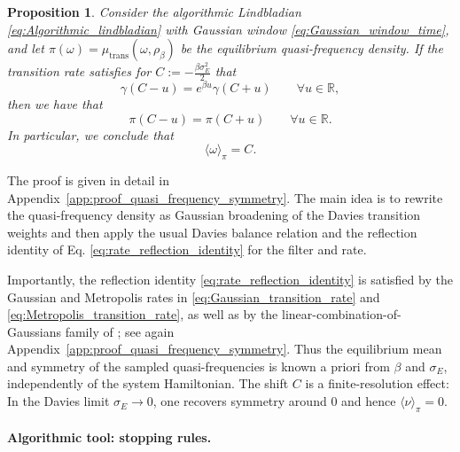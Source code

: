 \documentclass[showpacs,amsmath,amssymb,twocolumn,prx,superscriptaddress,10pt,aps,nofootinbib]{revtex4-2}
\newtheorem{proposition}{Proposition}
\begin{document}
\begin{proposition}
\label{thm:quasi_frequency_symmetry}
Consider the algorithmic Lindbladian \eqref{eq:Algorithmic_lindbladian} with Gaussian window \eqref{eq:Gaussian_window_time}, and let \(\pi(\omega)=\mu_{\mathrm{trans}}(\omega,\rho_\beta)\) be the equilibrium quasi-frequency density. If the transition rate satisfies for $C:=-\frac{\beta\sigma_E^2}{2}$ that
\begin{equation}
\label{eq:rate_reflection_identity}
    \gamma(C-u)=e^{\beta u}\gamma(C+u)
    \qquad
    \forall u\in\mathbb R,
\end{equation}
then we have that
\begin{equation}
    \pi(C-u)=\pi(C+u)
    \qquad
    \forall u\in\mathbb R.
\end{equation}
In particular, we conclude that
\begin{equation}
    \langle \omega\rangle_\pi=C.
\end{equation}
\end{proposition}

The proof is given in detail  in Appendix~\ref{app:proof_quasi_frequency_symmetry}. The main idea is to rewrite the quasi-frequency density as Gaussian broadening of the Davies transition weights and then apply the usual Davies balance relation and the reflection identity of Eq. \eqref{eq:rate_reflection_identity} for the filter and rate.

Importantly, the reflection identity \eqref{eq:rate_reflection_identity} is satisfied by the Gaussian and Metropolis rates in \eqref{eq:Gaussian_transition_rate} and \eqref{eq:Metropolis_transition_rate}, as well as by the linear-combination-of-Gaussians family of \cite{Chen2023a}; see again Appendix~\ref{app:proof_quasi_frequency_symmetry}. Thus the equilibrium mean and symmetry of the sampled quasi-frequencies is known a priori from $\beta$ and $\sigma_E$, independently of the system Hamiltonian. The shift $C$ is a finite-resolution effect: In the Davies limit $\sigma_E\to0$, one recovers symmetry around $0$ and hence $\langle \nu\rangle_\pi=0$.


\paragraph{Algorithmic tool: stopping rules.}
\end{document}
